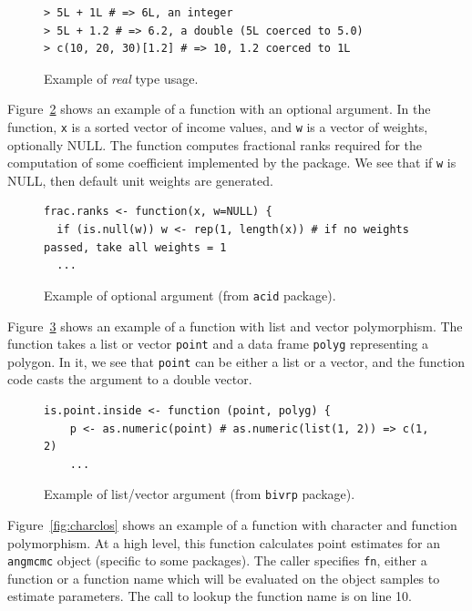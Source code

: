 \documentclass[acmsmall,10pt,review,anonymous]{acmart}\settopmatter{printfolios=true,printccs=false,printacmref=false}
\begin{document}
\begin{figure}[!hb]{\small\begin{lstlisting}[style=R]
> 5L + 1L # => 6L, an integer
> 5L + 1.2 # => 6.2, a double (5L coerced to 5.0)
> c(10, 20, 30)[1.2] # => 10, 1.2 coerced to 1L
\end{lstlisting}}\caption{Example of {\it real} type usage.}\label{fig:realex}\end{figure}

Figure~\ref{fig:optnull} shows an example of a function with an optional
argument.  In the function, {\tt x} is a sorted vector of income values, and
{\tt w} is a vector of weights, optionally NULL.  The function computes
fractional ranks required for the computation of some coefficient
implemented by the package.  We see that if {\tt w} is NULL, then default
unit weights are generated.

\begin{figure}[!hb]{\small\begin{lstlisting}[style=R]
frac.ranks <- function(x, w=NULL) {
  if (is.null(w)) w <- rep(1, length(x)) # if no weights passed, take all weights = 1
  ...
\end{lstlisting}}\caption{Example of optional argument (from {\tt acid} package).}\label{fig:optnull}\end{figure}

Figure~\ref{fig:listvec} shows an example of a function with list and vector
polymorphism.  The function takes a list or vector {\tt point} and a data
frame {\tt polyg} representing a polygon.  In it, we see that {\tt point}
can be either a list or a vector, and the function code casts the argument
to a double vector.

\begin{figure}[!hb]{\small\begin{lstlisting}[style=R]
is.point.inside <- function (point, polyg) {
    p <- as.numeric(point) # as.numeric(list(1, 2)) => c(1, 2)
    ...
\end{lstlisting}}\caption{Example of list/vector argument (from {\tt bivrp} package).}\label{fig:listvec}\end{figure}

Figure~\ref{fig:charclos} shows an example of a function with character and
function polymorphism.    At a high level, this function
calculates point estimates for an {\tt angmcmc} object (specific to some
packages).  The caller specifies {\tt fn}, either a function or a function
name which will be evaluated on the object samples to estimate parameters.
The call to lookup the function name is on line 10.
\end{document}
